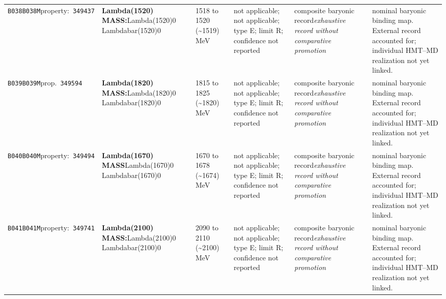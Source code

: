 \begin{landscape}
\begin{longtable}{L{1.85cm}L{4.45cm}L{2.35cm}L{4.05cm}L{3.35cm}L{7.15cm}}
\texttt{B038}\newline \texttt{B038M}\newline property:\ \texttt{349437} & \textbf{Lambda(1520) MASS:}\newline Lambda(1520)0 \textbar{}\allowbreak{} Lambdabar(1520)0 & 1518 to 1520 (\textasciitilde{}1519)\,MeV & not applicable; not applicable; type E; limit R; confidence not reported & composite baryonic record\newline \emph{exhaustive record without comparative promotion} & nominal baryonic binding map. External record accounted for; individual HMT--MD realization not yet linked. \\
\texttt{B039}\newline \texttt{B039M}\newline prop.\ \texttt{349594} & \textbf{Lambda(1820) MASS:}\newline Lambda(1820)0 \textbar{}\allowbreak{} Lambdabar(1820)0 & 1815 to 1825 (\textasciitilde{}1820)\,MeV & not applicable; not applicable; type E; limit R; confidence not reported & composite baryonic record\newline \emph{exhaustive record without comparative promotion} & nominal baryonic binding map. External record accounted for; individual HMT--MD realization not yet linked. \\
\texttt{B040}\newline \texttt{B040M}\newline property:\ \texttt{349494} & \textbf{Lambda(1670) MASS}\newline Lambda(1670)0 \textbar{}\allowbreak{} Lambdabar(1670)0 & 1670 to 1678 (\textasciitilde{}1674)\,MeV & not applicable; not applicable; type E; limit R; confidence not reported & composite baryonic record\newline \emph{exhaustive record without comparative promotion} & nominal baryonic binding map. External record accounted for; individual HMT--MD realization not yet linked. \\
\texttt{B041}\newline \texttt{B041M}\newline property:\ \texttt{349741} & \textbf{Lambda(2100) MASS:}\newline Lambda(2100)0 \textbar{}\allowbreak{} Lambdabar(2100)0 & 2090 to 2110 (\textasciitilde{}2100)\,MeV & not applicable; not applicable; type E; limit R; confidence not reported & composite baryonic record\newline \emph{exhaustive record without comparative promotion} & nominal baryonic binding map. External record accounted for; individual HMT--MD realization not yet linked. \\

\end{longtable}
\end{landscape}
